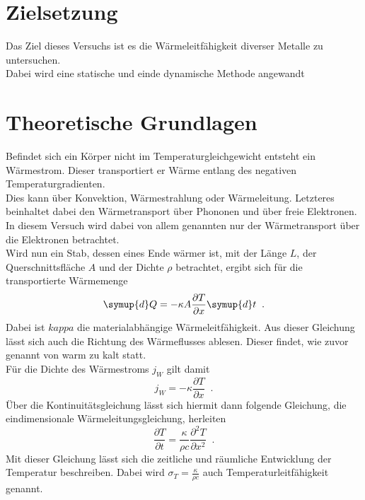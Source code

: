 \section{Zielsetzung}
Das Ziel dieses Versuchs ist es die Wärmeleitfähigkeit diverser Metalle zu untersuchen.\\
Dabei wird eine statische und einde dynamische Methode angewandt

\section{Theoretische Grundlagen}
Befindet sich ein Körper nicht im Temperaturgleichgewicht entsteht ein Wärmestrom.
Dieser transportiert er Wärme entlang des negativen Temperaturgradienten.\\
Dies kann über Konvektion, Wärmestrahlung oder Wärmeleitung. Letzteres beinhaltet dabei den Wärmetransport über Phononen und über freie Elektronen.\\
In diesem Versuch wird dabei von allem genannten nur der Wärmetransport über die Elektronen betrachtet.\\
Wird nun ein Stab, dessen eines Ende wärmer ist, mit der Länge $L$, der Querschnittsfläche $A$ und der Dichte $\rho$ betrachtet, ergibt sich für die transportierte Wärmemenge  
\begin{equation}
    \symup{d}Q=-\kappa A \frac{\partial T}{\partial x} \symup{d} t \; \; .
\end{equation}
Dabei ist $kappa$ die materialabhängige Wärmeleitfähigkeit. Aus dieser Gleichung lässt sich auch die Richtung des Wärmeflusses ablesen. 
Dieser findet, wie zuvor genannt von warm zu kalt statt.\\
Für die Dichte des Wärmestroms $j_W$ gilt damit
\begin{equation*}
    j_W=- \kappa \frac{\partial T}{\partial x} \; \; .
\end{equation*}
Über die Kontinuitätsgleichung lässt sich hiermit dann folgende Gleichung, die eindimensionale Wärmeleitungsgleichung, herleiten
\begin{equation*}
    \frac{\partial T}{\partial t} = \frac{\kappa}{\rho c} \frac{\partial ^2 T}{\partial x ^2} \; \; .
\end{equation*}
Mit dieser Gleichung lässt sich die zeitliche und räumliche Entwicklung der Temperatur beschreiben. Dabei wird $\sigma_T= \frac{\kappa}{\rho c}$ auch Temperaturleitfähigkeit genannt.\\\\

